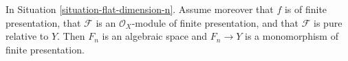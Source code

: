 %
\begin{theorem}
\label{theorem-flat-dimension-n-representable}
In Situation \ref{situation-flat-dimension-n}.
Assume moreover that $f$ is of finite presentation, that
$\mathcal{F}$ is an $\mathcal{O}_X$-module of finite presentation,
and that $\mathcal{F}$ is pure relative to $Y$.
Then $F_n$ is an algebraic space and
$F_n \to Y$ is a monomorphism of finite presentation.
\end{theorem}

